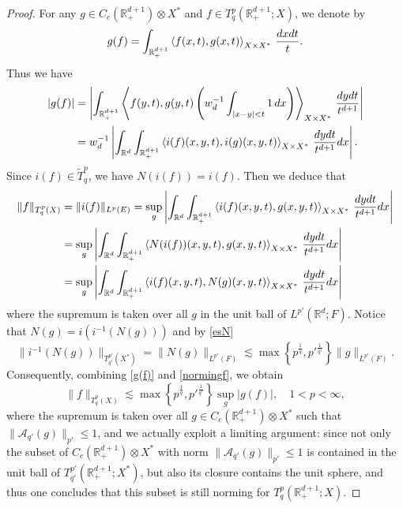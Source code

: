 \documentclass[oneside,english,a4wide]{amsart}
\numberwithin{equation}{section}
\numberwithin{figure}{section}
\theoremstyle{plain}
\theoremstyle{plain}
\theoremstyle{definition}
\theoremstyle{plain}
\theoremstyle{remark}
\theoremstyle{definition}
\theoremstyle{remark}
\theoremstyle{definition}
\newcommand{\real}{{\mathbb R}}
\newcommand{\ot}{\otimes}
\newcommand{\8}{+\infty}
\renewcommand{\1}{\mathbbm{1}}
\newcommand{\wt}{\widetilde}
\newcommand\jdz[1]{ \left| #1 \right| }
\newcommand\sk[1]{ \left( #1 \right) }
\newcommand\lk[1]{ \left\{ #1 \right\} }
\newcommand{\lara}[1]{\left\langle #1 \right\rangle}
\renewcommand\d{{\rm d}}
\begin{document}
{\begin{proof}
For any { $g \in C_c(\real^{d+1}_+) \ot X^*$ } and  $f \in T^p_q(\real^{d+1}_+; X)$, we denote by
\[
    g(f) = \int_{\real^{d+1}_+} \lara{ f(x, t), g(x, t) }_{X \times X^*} \,\frac{\d x\d t}{t}.
\]
Thus we have
\begin{equation}\label{g(f)}
\begin{split}
    |g(f)| & = \jdz{ \int_{\real^{d+1}_+} \lara{ f(y, t), g(y, t)\sk{ w_d^{-1}\int_{|x - y| < t} 1\,\d x } }_{X \times X^*} \,\frac{\d y\d t}{t^{d+1}} } \\
    & = w_d^{-1}\jdz{ \int_{\real^d}\int_{\real^{d+1}_+} \lara{ i(f)(x, y, t), i(g)(x, y, t) }_{X \times X^*} \,\frac{\d y\d t}{t^{d+1}}\d x }. 
\end{split}
\end{equation}
Since $i(f) \in \wt{T}^p_q$, we have $N(i(f)) = i(f)$. Then we deduce that 
\begin{equation}\label{normingf}
\begin{split}
    \| f \|_{T^p_q(X)} & = \| i(f) \|_{L^p(E)} = \sup_{g}\jdz{ \int_{\real^d}\int_{\real^{d+1}_+} \lara{ i(f)(x, y, t), g(x, y, t) }_{X \times X^*} \,\frac{\d y\d t}{t^{d+1}}\d x } \\
    & = \sup_{g}\jdz{ \int_{\real^d}\int_{\real^{d+1}_+} \lara{ N(i(f))(x, y, t), g(x, y, t) }_{X \times X^*} \,\frac{\d y\d t}{t^{d+1}}\d x } \\
    & = \sup_{g}\jdz{ \int_{\real^d}\int_{\real^{d+1}_+} \lara{ i(f)(x, y, t), N(g)(x, y, t) }_{X \times X^*} \,\frac{\d y\d t}{t^{d+1}}\d x }
\end{split}
\end{equation}
where the supremum is taken over all $g$ in the unit ball of $L^{p'}(\real^d; F)$. Notice that $N(g) = i\sk{i^{-1}(N(g))}$ and by \eqref{esN}
\[
    \| i^{-1}(N(g)) \|_{T^{p'}_{q'}(X^*) } = \| N(g) \|_{L^{p'}(F)} \lesssim \max\lk{ p^{\frac{1}{q}}, {p'}^{\frac{1}{q'}} }\| g \|_{L^{p'}(F)}.
\]
Consequently, combining \eqref{g(f)} and \eqref{normingf}, we obtain 
\[
    \| f \|_{T^p_q(X)} \lesssim \max\lk{ p^{\frac{1}{q}}, {p'}^{\frac{1}{q'}} } \sup_{g} |g(f)|, \quad 1 < p < \infty,
\]
where the supremum is taken over all $g\in C_c(\real^{d+1}_+)\otimes X^*$ such that $\|\mathcal{A}_{q'}(g)\|_{p'} \leq 1$, and we actually exploit a limiting argument: since not only the subset of $C_c(\real^{d+1}_+) \otimes X^*$ with norm $\|\mathcal{A}_{q'}(g)\|_{p'} \leq 1$ is contained in the unit ball of $T^{p'}_{q'}(\real^{d+1}_+; X^*)$, but also its closure contains the unit sphere, and thus one concludes that this subset is still norming for $T^p_q(\real^{d+1}_+; X)$. 


\end{proof}}
\end{document}
